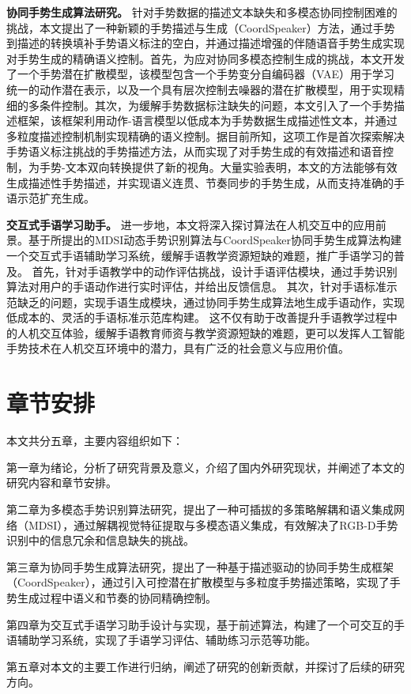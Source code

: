 \textbf{协同手势生成算法研究。} 
针对手势数据的描述文本缺失和多模态协同控制困难的挑战，本文提出了一种新颖的手势描述与生成（CoordSpeaker）方法，通过手势到描述的转换填补手势语义标注的空白，并通过描述增强的伴随语音手势生成实现对手势生成的精确语义控制。首先，为应对协同多模态控制生成的挑战，本文开发了一个手势潜在扩散模型，该模型包含一个手势变分自编码器（VAE）用于学习统一的动作潜在表示，以及一个具有层次控制去噪器的潜在扩散模型，用于实现精细的多条件控制。其次，为缓解手势数据标注缺失的问题，本文引入了一个手势描述框架，该框架利用动作-语言模型以低成本为手势数据生成描述性文本，并通过多粒度描述控制机制实现精确的语义控制。据目前所知，这项工作是首次探索解决手势语义标注挑战的手势描述方法，从而实现了对手势生成的有效描述和语音控制，为手势-文本双向转换提供了新的视角。大量实验表明，本文的方法能够有效生成描述性手势描述，并实现语义连贯、节奏同步的手势生成，从而支持准确的手语示范扩充生成。

\textbf{交互式手语学习助手。}
进一步地，本文将深入探讨算法在人机交互中的应用前景。基于所提出的MDSI动态手势识别算法与CoordSpeaker协同手势生成算法构建一个交互式手语辅助学习系统，缓解手语教学资源短缺的难题，推广手语学习的普及。
首先，针对手语教学中的动作评估挑战，设计手语评估模块，通过手势识别算法对用户的手语动作进行实时评估，并给出反馈信息。
其次，针对手语标准示范缺乏的问题，实现手语生成模块，通过协同手势生成算法地生成手语动作，实现低成本的、灵活的手语标准示范库构建。
这不仅有助于改善提升手语教学过程中的人机交互体验，缓解手语教育师资与教学资源短缺的难题\cite{2022signlearning}，更可以发挥人工智能手势技术在人机交互环境中的潜力，具有广泛的社会意义与应用价值。



\section{章节安排}

本文共分五章，主要内容组织如下：

第一章为绪论，分析了研究背景及意义，介绍了国内外研究现状，并阐述了本文的研究内容和章节安排。


第二章为多模态手势识别算法研究，提出了一种可插拔的多策略解耦和语义集成网络（MDSI），通过解耦视觉特征提取与多模态语义集成，有效解决了RGB-D手势识别中的信息冗余和信息缺失的挑战。

第三章为协同手势生成算法研究，提出了一种基于描述驱动的协同手势生成框架（CoordSpeaker），通过引入可控潜在扩散模型与多粒度手势描述策略，实现了手势生成过程中语义和节奏的协同精确控制。

第四章为交互式手语学习助手设计与实现，基于前述算法，构建了一个可交互的手语辅助学习系统，实现了手语学习评估、辅助练习示范等功能。

第五章对本文的主要工作进行归纳，阐述了研究的创新贡献，并探讨了后续的研究方向。
